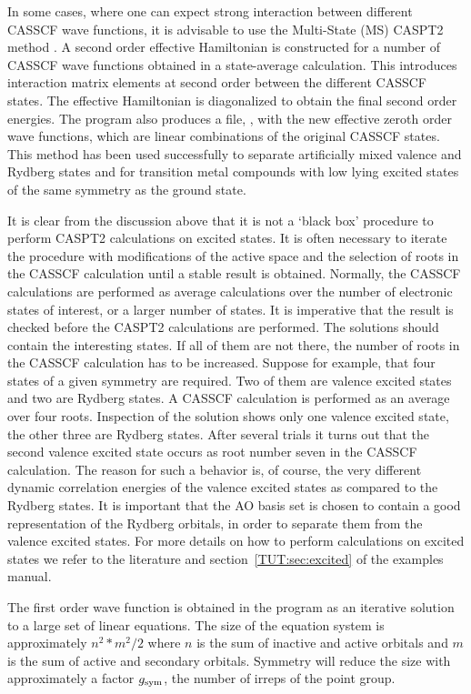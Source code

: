 In some cases, where one can expect strong interaction between different CASSCF
wave functions, it is advisable to use the Multi-State (MS) CASPT2 method
\cite{Finley:98b}. A second order effective Hamiltonian is constructed for a
number of CASSCF wave functions obtained in a state-average calculation. This
introduces interaction matrix elements at second order between the different
CASSCF states. The effective Hamiltonian is diagonalized to obtain the final
second order energies. The program also produces a file, , with the new
effective zeroth order wave functions, which are linear combinations of the
original CASSCF states. This method has been used successfully to separate
artificially mixed valence and Rydberg states and for transition metal compounds
with low lying excited states of the same symmetry as the ground state.

It is clear from the discussion above that it is not a `black box' procedure
to perform CASPT2 calculations on excited states. It is often necessary to
iterate the procedure with modifications of the active space and the selection
of roots in the CASSCF calculation until a stable result is obtained. Normally,
the CASSCF calculations are performed as average calculations over the number
of electronic states of interest, or a larger number of states.
It is imperative that the result is checked
before the CASPT2 calculations are performed. The solutions should contain
the interesting states. If all of them are not there, the number of roots in
the CASSCF calculation has to be increased. Suppose for example, that four
states of a given symmetry are required. Two of them are valence excited states
and two are Rydberg states. A CASSCF calculation is performed as an average
over four roots. Inspection of the solution shows only one valence excited
state, the other three are Rydberg states. After several trials it turns out
that the second valence excited state occurs as root number seven in the
CASSCF calculation. The reason for such a behavior is, of course, the
very different dynamic correlation energies of the valence excited states as
compared to the Rydberg states. It is important that the AO basis set is
chosen to contain a good representation of the Rydberg orbitals, in order to
separate them from the valence excited states. For more details on how to
perform calculations on excited states we refer to the
literature \cite{Roos:95b,Roos:96a} and section~\ref{TUT:sec:excited} of
the examples manual.

The first order wave function is obtained in the  program as an
iterative solution to a large set of linear equations. The size of the
equation system is approximately $n^2*m^2/2$ where $n$ is the sum of inactive
and active orbitals and $m$ is the sum of active and secondary orbitals.
Symmetry will reduce the size with approximately a factor $g_{\rm sym}$, the
number of irreps of the point group.

